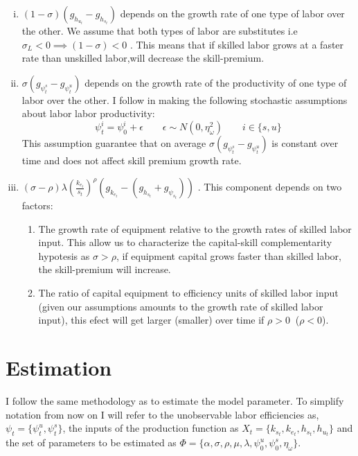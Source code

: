 \documentclass[12pt]{article}
\begin{document}
\begin{enumerate}[(i)]
  \item $(1-\sigma)(g_{h_{u_t}}-g_{h_{s_t}})$ depends on the growth rate of one type of labor over the other. We assume that both types of labor are substitutes i.e $\sigma_L < 0 \implies (1-\sigma) < 0$ . This means that if skilled labor grows at a faster rate than unskilled labor,will decrease the skill-premium.
  \item $\sigma\left(g_{\psi^s_t}-g_{\psi^u_t}\right)$ depends on the growth rate of the productivity of one type of labor over the other. I follow \citep{krusell2000capital} in making the following stochastic assumptions about labor labor productivity:
  \begin{equation}\label{eq:stochastic_labor_productivity}
    \psi^i_t = \psi^i_0 + \epsilon \qquad \epsilon \sim N(0, \eta_\omega^2) \qquad i\in\{s,u\}
  \end{equation}
  This assumption guarantee that on average $\sigma (g_{\psi^s_t}-g_{\psi^u_t} )$ is constant over time and does not affect skill premium growth rate. 
  \item $(\sigma-\rho) \lambda\left(\frac{k_{e_t}}{s_{t}}\right)^{\rho}\left(g_{k_{e_t}}-(g_{h_{s_t}}+g_{\psi_{s_t}})\right)$ . This component depends on two factors:
  \begin{enumerate}
    \item The growth rate of equipment relative to the growth rates of skilled labor input. This allow us to characterize the capital-skill complementarity hypotesis as $\sigma > \rho$, if equipment capital grows faster than skilled labor, the skill-premium will increase.
    \item The ratio of capital equipment to efficiency units of skilled labor input (given our assumptions amounts to the growth rate of skilled labor input), this efect will get larger (smaller) over time if $\rho > 0\:$ ($\rho < 0$). 
  \end{enumerate}
\end{enumerate}

\section{Estimation}
I follow the same methodology as \citep{krusell2000capital} to estimate the model parameter. To simplify notation from now on I will refer to  the unobservable labor efficiencies as, $\psi_t = \{\psi^u_t, \psi^s_t\}$, the  inputs of the production function as $X_t = \{ k_{s_t} , k_{e_t}, h_{s_t}, h_{u_t}\}$ and the set of parameters to be estimated  as $\Phi  = \{\alpha, \sigma, \rho, \mu, \lambda, \psi^u_0, \psi^s_0, \eta_\omega \}$. 
\end{document}
